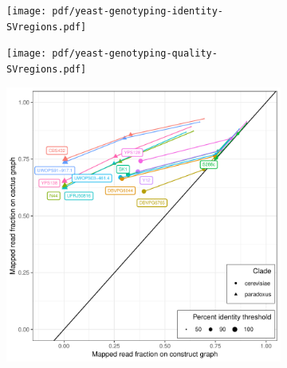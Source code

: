 \documentclass{article}
\begin{document}
\clearpage
\begin{figure}
  \begin{subfigure}[b]{.6\textwidth}
    \caption{}
    \texttt{[image: pdf/yeast-genotyping-identity-SVregions.pdf]}
  \end{subfigure}
  \begin{subfigure}[b]{.4\textwidth}
    \caption{}
    \texttt{[image: pdf/yeast-genotyping-quality-SVregions.pdf]}
  \end{subfigure}
\end{figure}

\clearpage
\begin{figure}
  \begin{subfigure}[b]{.5\textwidth}
    \caption{}
    \includegraphics[width=\textwidth]{pdf/yeast-mapping-identity-all.pdf}
  \end{subfigure}
  \begin{subfigure}[b]{.5\textwidth}
    \caption{}

\end{subfigure}
\end{figure}
\end{document}

